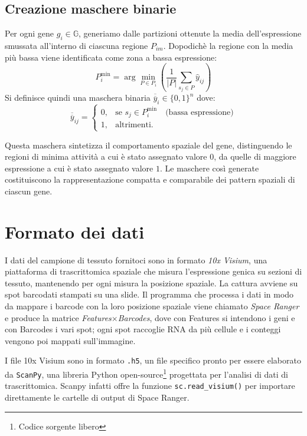 \subsection{Creazione maschere binarie}\label{subsec:CreazioneMaschereBinarie}
Per ogni gene $g_i \in \mathbb{G}$, generiamo dalle partizioni ottenute la media dell'espressione smussata all'interno di ciascuna regione $P_{im}$.
Dopodichè la regione con la media più bassa viene identificata come zona a bassa espressione:
\begin{equation}
	\label{ec:BassaEspressione}
	P_i^{\text{min}} = \arg\min_{P \in P_i} \left(\frac{1}{|P|} \sum_{s_j \in P} \hat{y}_{ij}\right)
\end{equation}
Si definisce quindi una maschera binaria $\overline{\overline{y}}_i \in \{0, 1\}^n$ dove:
\begin{equation}
	\label{eq:BinaryMaskEq}
	\overline{\overline{y}}_{ij} =
		\begin{cases}
			0, & \text{se } s_j \in P_i^{\text{min}} \quad \text{(bassa espressione)}\\[4pt]
			1, & \text{altrimenti.}
		\end{cases}
\end{equation}

Questa maschera sintetizza il comportamento spaziale del gene, 
distinguendo le regioni di minima attività a cui è stato 
assegnato valore $0$, da quelle di maggiore espressione a cui 
è stato assegnato valore $1$.
Le maschere così generate costituiscono la 
rappresentazione compatta e comparabile dei pattern 
spaziali di ciascun gene.

\section{Formato dei dati}\label{sec:cap_three_notions}
I dati del campione di tessuto fornitoci sono in formato \textit{10x Visium}, una piattaforma 
di trascrittomica spaziale che misura l'espressione genica 
su sezioni di tessuto, mantenendo per ogni misura la posizione spaziale. 
La cattura avviene su spot barcodati stampati su una slide. Il programma che processa i dati in modo da mappare i barcode con la loro 
posizione spaziale viene chiamato \textit{Space Ranger} e produce la matrice \textit{Features}$\times$\textit{Barcodes}, dove con Features si intendono i geni 
e con Barcodes i vari spot; 
ogni spot raccoglie RNA da più cellule e i conteggi vengono poi mappati sull'immagine.


I file 10x Visium sono in formato \texttt{.h5}, un file specifico pronto per essere 
elaborato da \texttt{ScanPy}, una libreria Python open-source\footnote{Codice sorgente libero} progettata per l'analisi di dati di trascrittomica.
Scanpy infatti offre la funzione \texttt{sc.read\_visium()} per importare direttamente le cartelle di output di Space Ranger.


